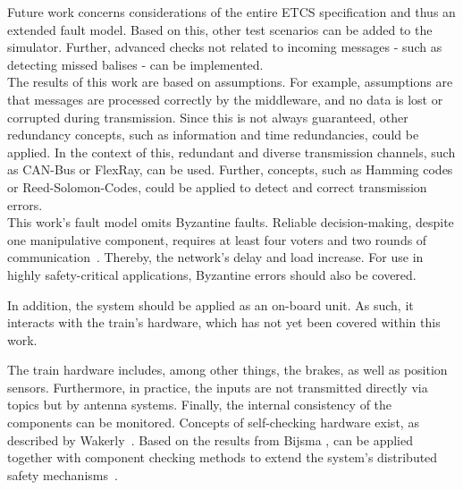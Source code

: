 Future work concerns considerations of the entire ETCS specification and thus an extended fault model.
Based on this, other test scenarios can be added to the simulator.
Further, advanced checks not related to incoming messages - such as detecting missed balises - can be implemented.
\\

The results of this work are based on assumptions.
For example, assumptions are that messages are processed correctly by the middleware, and no data is lost or corrupted during transmission.
Since this is not always guaranteed, other redundancy concepts, such as information and time redundancies, could be applied.
In the context of this, redundant and diverse transmission channels, such as CAN-Bus or FlexRay, can be used.
Further,  concepts, such as Hamming codes or Reed-Solomon-Codes, could be applied to detect and correct transmission errors.
\\

This work's fault model omits Byzantine faults.
Reliable decision-making, despite one manipulative component, requires at least four voters and two rounds of communication~\cite{GamerIncreasingMOON}.
Thereby, the network's delay and load increase.
For use in highly safety-critical applications, Byzantine errors should also be covered.

In addition, the system should be applied as an on-board unit.
As such, it interacts with the train's hardware, which has not yet been covered within this work.

The train hardware includes, among other things, the brakes, as well as position sensors.
Furthermore, in practice, the inputs are not transmitted directly via  topics but by antenna systems.
Finally, the internal consistency of the components can be monitored.
Concepts of self-checking hardware exist, as described by Wakerly~\cite{SelfCheckingProcessorDesign}.
Based on the results from Bijsma \etal,  can be applied together with component checking methods to extend the system's distributed safety mechanisms~\cite{DistributedSafety2020}.